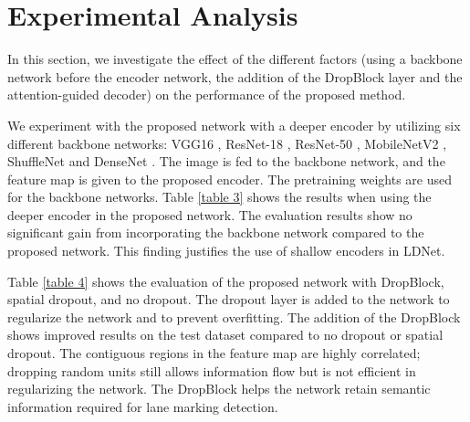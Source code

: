 \documentclass[journal]{IEEEtran}
\begin{document}
\section{Experimental Analysis}
In this section, we investigate the effect of the different factors (using a backbone network before the encoder network, the addition of the DropBlock layer and the attention-guided decoder) on the performance of the proposed method.
\par
We experiment with the proposed network with a deeper encoder by utilizing six different backbone networks: VGG16 \cite{vgg}, ResNet-18 \cite{resnet}, ResNet-50 \cite{resnet}, MobileNetV2 \cite{mobilenet}, ShuffleNet \cite{shufflenet} and DenseNet \cite{densenet}. The image is fed to the backbone network, and the feature map is given to the proposed encoder. The pretraining weights are used for the backbone networks. Table \ref{table 3} shows the results when using the deeper encoder in the proposed network. The evaluation results show no significant gain from incorporating the backbone network compared to the proposed network. This finding justifies the use of shallow encoders in LDNet.
\par
Table \ref{table 4} shows the evaluation of the proposed network with DropBlock, spatial dropout, and no dropout. The dropout layer is added to the network to regularize the network and to prevent overfitting. The addition of the DropBlock shows improved results on the test dataset compared to no dropout or spatial dropout. The contiguous regions in the feature map are highly correlated; dropping random units still allows information flow but is not efficient in regularizing the network. The DropBlock helps the network retain semantic information required for lane marking detection.
\par
\end{document}

